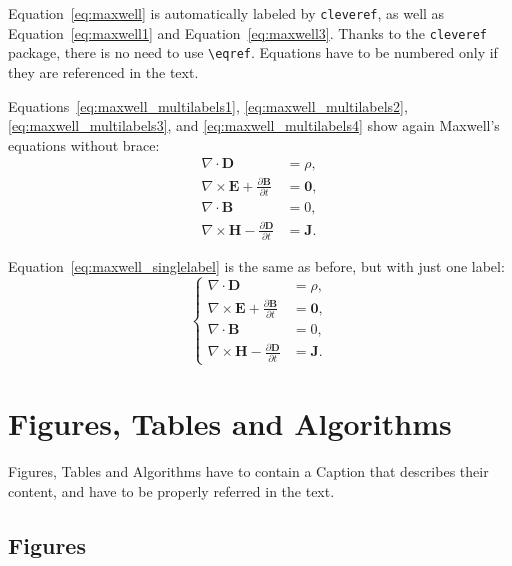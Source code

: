 \documentclass[11pt,a4paper]{article}
\begin{document}
Equation~\eqref{eq:maxwell} is automatically labeled by \texttt{cleveref},
as well as Equation~\eqref{eq:maxwell1} and Equation~\eqref{eq:maxwell3}.
Thanks to the \verb|cleveref| package, there is no need to use \verb|\eqref|.
Equations have to be numbered only if they are referenced in the text.

Equations~\eqref{eq:maxwell_multilabels1}, \eqref{eq:maxwell_multilabels2}, \eqref{eq:maxwell_multilabels3}, and \eqref{eq:maxwell_multilabels4} show again Maxwell's equations without brace:
\begin{align}
\nabla\cdot \bm{D} & = \rho, \label{eq:maxwell_multilabels1} \\
\nabla \times \bm{E} +  \frac{\partial \bm{B}}{\partial t} &= \bm{0}, \label{eq:maxwell_multilabels2} \\
\nabla\cdot \bm{B} & = 0, \label{eq:maxwell_multilabels3} \\
\nabla \times \bm{H} - \frac{\partial \bm{D}}{\partial t} &= \bm{J} \label{eq:maxwell_multilabels4}.
\end{align}

Equation~\eqref{eq:maxwell_singlelabel} is the same as before,
but with just one label:
\begin{equation}
\label{eq:maxwell_singlelabel}
\left\{
\begin{aligned}
\nabla\cdot \bm{D} & = \rho, \\
\nabla \times \bm{E} +  \frac{\partial \bm{B}}{\partial t} &= \bm{0},\\
\nabla\cdot \bm{B} & = 0, \\
\nabla \times \bm{H} - \frac{\partial \bm{D}}{\partial t} &= \bm{J}.
\end{aligned}
\right.
\end{equation}

\section{Figures, Tables and Algorithms}

Figures, Tables and Algorithms have to contain a Caption that describes their content, and have to be properly referred in the text.

\subsection{Figures}
\label{subsec:figures}
\end{document}
